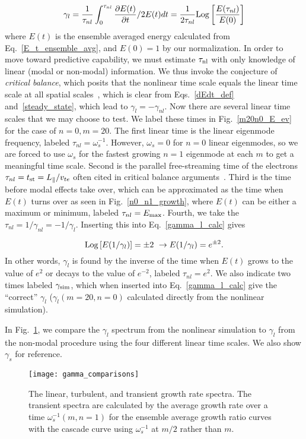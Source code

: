 \documentclass[letter,scriptaddress,twocolumn, prl,showkeys]{revtex4}
\def\beq{\begin{equation}}
\def\eeq{\end{equation}}
\def\para{\parallel}
\newcommand{\pdiff}[2]{\frac{\partial#1}{\partial#2}}
\begin{document}
\beq
\label{gamma_l_calc}
\gamma_l = \frac{1}{\tau_{nl}} \int_0^{\tau_{nl}} \pdiff{E(t)}{t}/ 2 E(t) dt = \frac{1}{2 \tau_{nl}} {\rm{Log}} \left[ \frac{E(\tau_{nl})}{E(0)}\right]
\eeq
where $E(t)$ is the ensemble averaged energy calculated from Eq.~\ref{E_t_ensemble_avg}, and $E(0) = 1$ by our normalization.
In order to move toward predictive capability, we must estimate $\tau_{\rm{nl}}$ with only knowledge of linear (modal or non-modal) information. 
We thus invoke the conjecture of \emph{critical balance}, which posits that the nonlinear time scale equals the linear time scale at all spatial scales~\cite{schekochihin2012}, which is clear from 
Eqs.~\ref{dEdt_def} and~\ref{steady_state}, which lead to $\gamma_l = - \gamma_{nl}$. Now there are several linear time scales that we may choose to test. We label these times in Fig.~\ref{m20n0_E_ev}
for the case of $n=0, m=20$. The first linear time is the linear eigenmode frequency, labeled
$\tau_{nl} = \omega_s^{-1}$. However, $\omega_s = 0$ for $n=0$ linear eigenmodes, so we are forced to use $\omega_s$ for the fastest growing $n=1$ eigenmode at each $m$ to get a meaningful time scale.
Second is the parallel free-streaming time of the electrons $\tau_{nl} = t_{\rm{st}} = L_\para/v_{t e}$ often cited in critical balance arguments~\cite{barnes}. Third is the time before modal effects
take over, which can be approximated as the time when $E(t)$ turns over as seen in Fig.~\ref{n0_n1_growth}, where $E(t)$ can be either a maximum or minimum, labeled $\tau_{nl} = E_{\rm{max}}$. 
Fourth, we take the $\tau_{nl} = 1/\gamma_{nl} = - 1/\gamma_l$. Inserting this into Eq.~\ref{gamma_l_calc} gives

\beq
\label{fourth_gamma_cond}
 {\rm{Log}} \left[ E(1/\gamma_l)\right] = \pm 2 \ \rightarrow E(1/\gamma_l) = e^{\pm 2}.
\eeq
In other words, $\gamma_l$ is found by the inverse of the time when $E(t)$ grows to the value of $e^2$ or decays to the value of $e^{-2}$, labeled $\tau_{nl} = e^2$. We also indicate two times
labeled $\gamma_{\rm{sim}}$, which when inserted into Eq.~\ref{gamma_l_calc} give the ``correct'' $\gamma_l$ ($\gamma_l(m=20,n=0)$ calculated directly from the nonlinear simulation).

In Fig.~\ref{gamma_comparisons}, we compare the $\gamma_{l}$ spectrum from the nonlinear simulation to $\gamma_l$ from the non-modal procedure using the four different linear time scales. We also show
$\gamma_s$ for reference.

\begin{figure}
\centerline{\texttt{[image: gamma\_comparisons]}}
\caption{The linear, turbulent, and transient growth rate spectra. The transient spectra are calculated by the average growth rate over a time $\omega_s^{-1}(m,n=1)$ for the ensemble average
growth ratio curves with the cascade curve using $\omega_s^{-1}$ at $m/2$ rather than $m$.}
\label{gamma_comparisons}
\end{figure}
\end{document}
